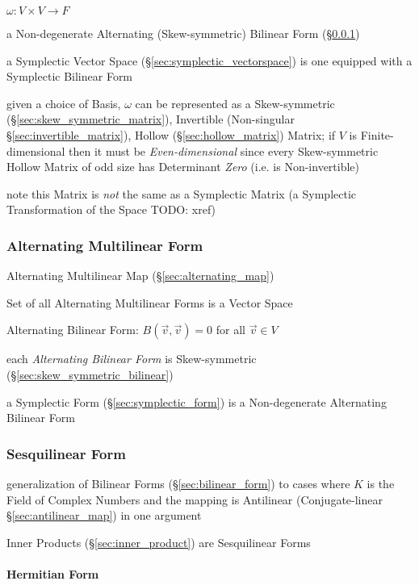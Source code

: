 $\omega : V \times V \rightarrow F$

a Non-degenerate Alternating (Skew-symmetric) Bilinear Form
(\S\ref{sec:alternating_form})

a Symplectic Vector Space (\S\ref{sec:symplectic_vectorspace}) is one equipped
with a Symplectic Bilinear Form

given a choice of Basis, $\omega$ can be represented as a Skew-symmetric
(\S\ref{sec:skew_symmetric_matrix}), Invertible (Non-singular
\S\ref{sec:invertible_matrix}), Hollow (\S\ref{sec:hollow_matrix}) Matrix; if
$V$ is Finite-dimensional then it must be \emph{Even-dimensional} since every
Skew-symmetric Hollow Matrix of odd size has Determinant \emph{Zero} (i.e. is
Non-invertible)

note this Matrix is \emph{not} the same as a Symplectic Matrix (a Symplectic
Transformation of the Space TODO: xref)



\subsubsection{Alternating Multilinear Form}\label{sec:alternating_form}

Alternating Multilinear Map (\S\ref{sec:alternating_map})

Set of all Alternating Multilinear Forms is a Vector Space

Alternating Bilinear Form: $B(\vec{v},\vec{v}) = 0$ for all $\vec{v} \in V$

each \emph{Alternating Bilinear Form} is Skew-symmetric
(\S\ref{sec:skew_symmetric_bilinear})

a Symplectic Form (\S\ref{sec:symplectic_form}) is a Non-degenerate Alternating
Bilinear Form



\subsubsection{Sesquilinear Form}\label{sec:sesquilinear_form}

generalization of Bilinear Forms (\S\ref{sec:bilinear_form}) to cases where $K$
is the Field of Complex Numbers and the mapping is Antilinear (Conjugate-linear
\S\ref{sec:antilinear_map}) in one argument

Inner Products (\S\ref{sec:inner_product}) are Sesquilinear Forms



\paragraph{Hermitian Form}\label{sec:hermitian_form}\hfill

